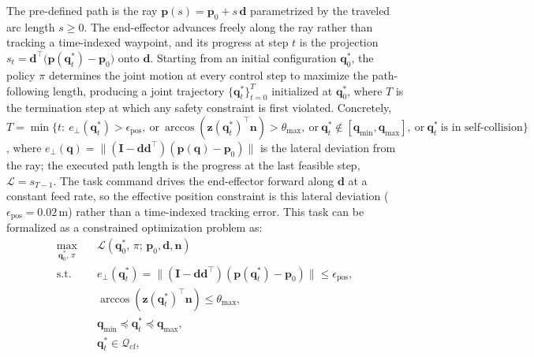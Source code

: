 \documentclass[journal, twoside]{IEEEtran}
\begin{document}
The pre-defined path is the ray $\mathbf{p}(s)=\mathbf{p}_{0}+s\,\mathbf{d}$ parametrized by the traveled arc length $s\ge 0$. The end-effector advances freely along the ray rather than tracking a time-indexed waypoint, and its progress at step $t$ is the projection $s_{t}=\mathbf{d}^{\top}\!\big(\mathbf{p}(\mathbf{q}_{t}^{*})-\mathbf{p}_{0}\big)$ onto $\mathbf{d}$. Starting from an initial configuration $\mathbf{q}_{0}^{*}$, the policy $\pi$ determines the joint motion at every control step to maximize the path-following length, producing a joint trajectory $\{\mathbf{q}_{t}^{*}\}_{t=0}^{T}$ initialized at $\mathbf{q}_{0}^{*}$, where $T$ is the termination step at which any safety constraint is first violated. Concretely, $T=\min\{t:\ e_{\perp}(\mathbf{q}_{t}^{*})>\epsilon_{\text{pos}},\ \text{or}\ \arccos(\mathbf{z}(\mathbf{q}_{t}^{*})^{\top}\mathbf{n})>\theta_{\max},\ \text{or}\ \mathbf{q}_{t}^{*}\notin[\mathbf{q}_{\min},\mathbf{q}_{\max}],\ \text{or}\ \mathbf{q}_{t}^{*}\ \text{is in self-collision}\}$, where $e_{\perp}(\mathbf{q})=\|(\mathbf{I}-\mathbf{d}\mathbf{d}^{\top})(\mathbf{p}(\mathbf{q})-\mathbf{p}_{0})\|$ is the lateral deviation from the ray; the executed path length is the progress at the last feasible step, $\mathcal{L}=s_{T-1}$. The task command drives the end-effector forward along $\mathbf{d}$ at a constant feed rate, so the effective position constraint is this lateral deviation ($\epsilon_{\text{pos}}{=}0.02$\,m) rather than a time-indexed tracking error. This task can be formalized as a constrained optimization problem as:
\begin{align}
\max_{\mathbf{q}_{0}^{*},\,\pi} \quad & \mathcal{L}(\mathbf{q}^{*}_{0},\,\pi;\,\mathbf{p}_{0}, \mathbf{d}, \mathbf{n}) \\
\text{s.t.} \quad & e_{\perp}(\mathbf{q}_{t}^{*}) = \big\|(\mathbf{I}-\mathbf{d}\mathbf{d}^{\top})(\mathbf{p}(\mathbf{q}_{t}^{*})-\mathbf{p}_{0})\big\| \leq \epsilon_{\text{pos}}, \\
& \arccos\!\left( \mathbf{z}(\mathbf{q}_{t}^{*})^{\top} \mathbf{n} \right) \leq \theta_{\max}, \label{eq:ori_constraint} \\
& \mathbf{q}_{\min} \preceq \mathbf{q}_{t}^{*} \preceq \mathbf{q}_{\max}, \label{eq:jl_constraint} \\
& \mathbf{q}_{t}^{*} \in \mathcal{Q}_{\mathrm{cf}}, \label{eq:collision_constraint}
\end{align}
\end{document}
